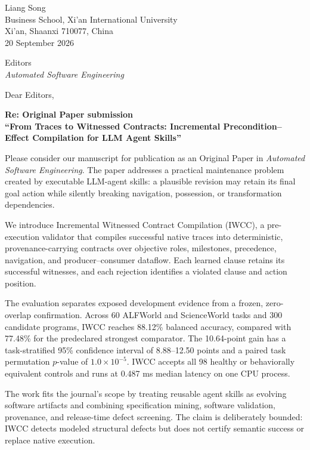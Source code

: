 \documentclass[10pt]{article}
\begin{document}
\begin{flushright}
Liang Song\\
Business School, Xi'an International University\\
Xi'an, Shaanxi 710077, China\\
20 September 2026
\end{flushright}

Editors\\
\textit{Automated Software Engineering}

Dear Editors,

\begin{center}
\end{center}

\noindent\textbf{Re: Original Paper submission}\\
\textbf{``From Traces to Witnessed Contracts: Incremental Precondition--Effect
Compilation for LLM Agent Skills''}

Please consider our manuscript for publication as an Original Paper in
\textit{Automated Software Engineering}. The paper addresses a practical
maintenance problem created by executable LLM-agent skills: a plausible
revision may retain its final goal action while silently breaking navigation,
possession, or transformation dependencies.

We introduce Incremental Witnessed Contract Compilation (IWCC), a
pre-execution validator that compiles successful native traces into
deterministic, provenance-carrying contracts over objective roles, milestones,
precedence, navigation, and producer--consumer dataflow. Each learned clause
retains its successful witnesses, and each rejection identifies a violated
clause and action position.

The evaluation separates exposed development evidence from a frozen,
zero-overlap confirmation. Across 60 ALFWorld and ScienceWorld tasks and 300
candidate programs, IWCC reaches 88.12\% balanced accuracy, compared with
77.48\% for the predeclared strongest comparator. The 10.64-point gain has a
task-stratified 95\% confidence interval of 8.88--12.50 points and a paired
task permutation $p$-value of $1.0\times10^{-5}$. IWCC accepts all 98 healthy
or behaviorally equivalent controls and runs at 0.487 ms median latency on one
CPU process.

The work fits the journal's scope by treating reusable agent skills as evolving
software artifacts and combining specification mining, software validation,
provenance, and release-time defect screening. The claim is deliberately
bounded: IWCC detects modeled structural defects but does not certify semantic
success or replace native execution.
\end{document}
